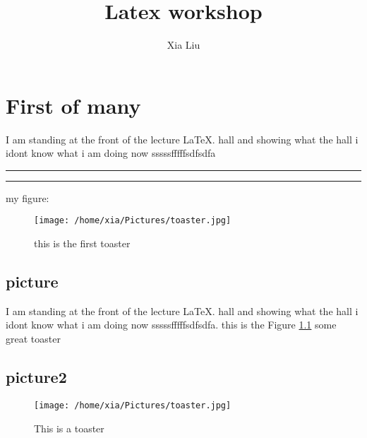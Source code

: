 \documentclass[12pt,letterpaper,onecolumn]{report}
\author{Xia Liu}
\title{Latex workshop}   %
\begin{document}
\maketitle %





\chapter{First of many}
\label{chp:first}



\noindent I am standing at the front of the lecture \LaTeX . hall and showing what the hall i idont know what i am doing now sssssfffffsdfsdfa\\
\hrule %
\vspace{0.2cm} %
\hrule
\vspace{0.2cm} %
\noindent my figure:


\begin{figure}[!ht] %
\centering
\texttt{[image: /home/xia/Pictures/toaster.jpg]}
\caption{this is the first toaster}
\label{fig:gir} %
\end{figure}

\section{picture}
\label{sec:first}
\noindent I am standing at the front of the lecture \LaTeX . hall and showing what the hall i idont know what i am doing now sssssfffffsdfsdfa. this is the Figure \ref{fig:gir} some great toaster\\


\newpage %
\section{picture2}
\label{sec:second}
\begin{figure}[!ht] %
\centering
\texttt{[image: /home/xia/Pictures/toaster.jpg]}
\caption{This is a toaster} %
\label{it can be anything}
\end{figure}
\end{document}
